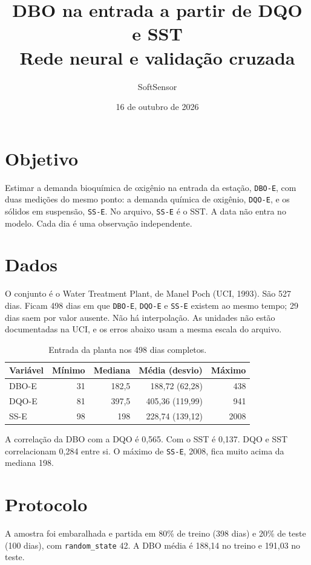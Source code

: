 \documentclass[11pt,a4paper]{article}
\title{DBO na entrada a partir de DQO e SST\\[0.3em]
\large Rede neural e validação cruzada}
\author{SoftSensor}
\date{16 de outubro de 2026}
\begin{document}
\maketitle

\section{Objetivo}

Estimar a demanda bioquímica de oxigênio na entrada da estação, \texttt{DBO-E}, com duas medições do mesmo ponto: a demanda química de oxigênio, \texttt{DQO-E}, e os sólidos em suspensão, \texttt{SS-E}. No arquivo, \texttt{SS-E} é o SST. A data não entra no modelo. Cada dia é uma observação independente.

\section{Dados}

O conjunto é o Water Treatment Plant, de Manel Poch (UCI, 1993). São 527 dias. Ficam 498 dias em que \texttt{DBO-E}, \texttt{DQO-E} e \texttt{SS-E} existem ao mesmo tempo; 29 dias saem por valor ausente. Não há interpolação. As unidades não estão documentadas na UCI, e os erros abaixo usam a mesma escala do arquivo.

\begin{table}[ht]
\centering
\caption{Entrada da planta nos 498 dias completos.}
\begin{tabular}{lrrrr}
\toprule
Variável & Mínimo & Mediana & Média (desvio) & Máximo \\
\midrule
DBO-E & 31 & 182,5 & 188,72 (62,28) & 438 \\
DQO-E & 81 & 397,5 & 405,36 (119,99) & 941 \\
SS-E  & 98 & 198 & 228,74 (139,12) & 2008 \\
\bottomrule
\end{tabular}
\end{table}

A correlação da DBO com a DQO é 0,565. Com o SST é 0,137. DQO e SST correlacionam 0,284 entre si. O máximo de \texttt{SS-E}, 2008, fica muito acima da mediana 198.

\section{Protocolo}

A amostra foi embaralhada e partida em 80\% de treino (398 dias) e 20\% de teste (100 dias), com \texttt{random\_state} 42. A DBO média é 188,14 no treino e 191,03 no teste.
\end{document}
